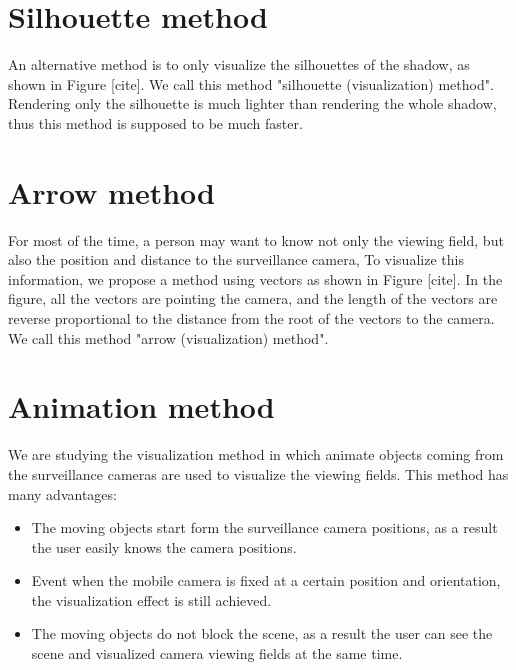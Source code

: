 \section{Silhouette method}

An alternative method is to only visualize the silhouettes of the shadow, as shown in Figure [cite]. We call this method "silhouette (visualization) method". Rendering only the silhouette is much lighter than rendering the whole shadow, thus this method is supposed to be much faster.

\section{Arrow method}

For most of the time, a person may want to know not only the viewing field, but also the position and distance to the surveillance camera, To visualize this information, we propose a method using vectors as shown in Figure [cite]. In the figure, all the vectors are pointing the camera, and the length of the vectors are reverse proportional to the distance from the root of the vectors to the camera. We call this method "arrow (visualization) method".

\section{Animation method}

We are studying the visualization method in which animate objects coming from the surveillance cameras are used to visualize the viewing fields. This method has  many advantages:

\begin{itemize}
\item The moving objects start form the surveillance camera positions, as a result the user easily knows the camera positions.
\item Event when the mobile camera is fixed at a certain position and orientation, the visualization effect is still achieved.
\item The moving objects do not block the scene, as a result the user can see the scene and visualized camera viewing fields at the same time.
\end{itemize}
